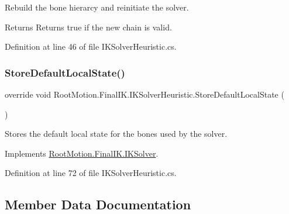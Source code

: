 Rebuild the bone hierarcy and reinitiate the solver. 

\begin{DoxyReturn}{Returns}
Returns true if the new chain is valid. 
\end{DoxyReturn}


Definition at line 46 of file I\+K\+Solver\+Heuristic.\+cs.

\mbox{\label{class_root_motion_1_1_final_i_k_1_1_i_k_solver_heuristic_a58192848dbddf53c43c8ce54c3346557}} 
\subsubsection{\texorpdfstring{Store\+Default\+Local\+State()}{StoreDefaultLocalState()}}
{\footnotesize\ttfamily override void Root\+Motion.\+Final\+I\+K.\+I\+K\+Solver\+Heuristic.\+Store\+Default\+Local\+State (\begin{DoxyParamCaption}{ }\end{DoxyParamCaption})\hspace{0.3cm}{\ttfamily [virtual]}}



Stores the default local state for the bones used by the solver. 



Implements \mbox{\hyperlink{class_root_motion_1_1_final_i_k_1_1_i_k_solver_a5009a12837b12c96fed91bc6dc0bd4b6}{Root\+Motion.\+Final\+I\+K.\+I\+K\+Solver}}.



Definition at line 72 of file I\+K\+Solver\+Heuristic.\+cs.



\subsection{Member Data Documentation}
\mbox{\label{class_root_motion_1_1_final_i_k_1_1_i_k_solver_heuristic_af2f1ea1642dbe9276519e9bbabef2d9d}} 
